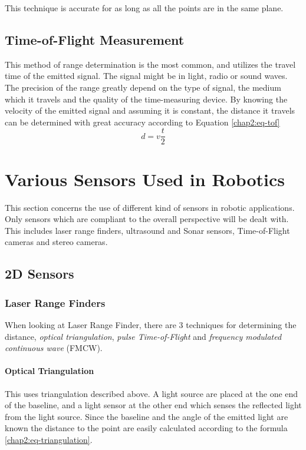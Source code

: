 This technique is accurate for as long as all the points are in the same plane.


\subsection{Time-of-Flight Measurement}
This method of range determination is the most common, and utilizes the travel time of the
emitted signal. The signal might be in light, radio or sound waves. The precision of the
range greatly depend on the type of signal, the medium which it travels and the quality of
the time-measuring device. By knowing the velocity of the emitted signal and assuming it
is constant, the distance it travels can be determined with great accuracy according to 
Equation \eqref{chap2:eq-tof}
\begin{equation}
    \label{chap2:eq-tof}
    d = v \frac{t}{2}
\end{equation}



\section{Various Sensors Used in Robotics}
This section concerns the use of different kind of sensors in robotic applications. Only
sensors which are compliant to the overall perspective will be dealt with. This includes
laser range finders, ultrasound and Sonar sensors, Time-of-Flight cameras and
stereo cameras. 

\subsection{2D Sensors}

\subsubsection{Laser Range Finders}


When looking at Laser Range Finder, there are 3 techniques for determining the distance,
\emph{optical triangulation}, \emph{pulse Time-of-Flight} and \emph{frequency modulated
continuous wave} (FMCW). \cite{laser-ranging-critical-review}

\paragraph{Optical Triangulation}
This uses triangulation described above. A light source are placed at the one end of the
baseline, and a light sensor at the other end which senses the reflected light from the
light source. Since the baseline and the angle of the emitted light are known the distance
to the point are easily calculated according to the formula
\eqref{chap2:eq-triangulation}.

